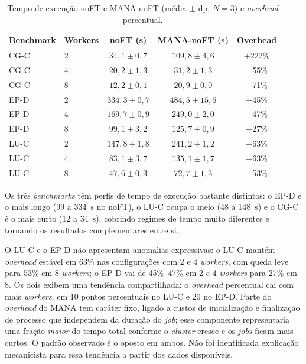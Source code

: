 \begin{table}[htb]
  \caption{Tempo de execução noFT e MANA-noFT (média $\pm$ dp, $N=3$) e
           \textit{overhead} percentual.}
  \label{tab:overhead}
  \centering
  \begin{tabular}{llccc}
    \toprule
    Benchmark & Workers & noFT (s) & MANA-noFT (s) & Overhead \\
    \midrule
    CG-C & 2 & $34{,}1 \pm 0{,}7$  & $109{,}8 \pm 4{,}6$  & +222\% \\
    CG-C & 4 & $20{,}2 \pm 1{,}3$  & $31{,}2 \pm 1{,}3$   & +55\% \\
    CG-C & 8 & $12{,}2 \pm 0{,}1$  & $20{,}9 \pm 0{,}0$   & +71\% \\
    \addlinespace
    EP-D & 2 & $334{,}3 \pm 0{,}7$ & $484{,}5 \pm 15{,}6$ & +45\% \\
    EP-D & 4 & $169{,}7 \pm 0{,}9$ & $249{,}0 \pm 2{,}0$  & +47\% \\
    EP-D & 8 & $99{,}1 \pm 3{,}2$  & $125{,}7 \pm 0{,}9$  & +27\% \\
    \addlinespace
    LU-C & 2 & $147{,}8 \pm 1{,}8$ & $241{,}2 \pm 1{,}2$  & +63\% \\
    LU-C & 4 & $83{,}1 \pm 3{,}7$  & $135{,}1 \pm 1{,}7$  & +63\% \\
    LU-C & 8 & $47{,}6 \pm 0{,}3$  & $72{,}7 \pm 1{,}3$   & +53\% \\
    \bottomrule
  \end{tabular}
\end{table}

Os três \textit{benchmarks} têm perfis de tempo de execução bastante distintos:
o EP-D é o mais longo (99 a 334~s no noFT), o LU-C ocupa o meio (48 a 148~s) e
o CG-C é o mais curto (12 a 34~s), cobrindo regimes de tempo muito diferentes e
tornando os resultados complementares entre si.

O LU-C e o EP-D não apresentam
anomalias expressivas: o LU-C mantém \textit{overhead} estável em 63\% nas
configurações com 2 e 4 \textit{workers}, com queda leve para 53\% em 8
\textit{workers}; o EP-D vai de 45\%--47\% em 2 e 4 \textit{workers} para 27\%
em 8. Os dois exibem uma tendência compartilhada: o \textit{overhead} percentual
cai com mais \textit{workers}, em 10 pontos percentuais no LU-C e 20 no EP-D.
Parte do \textit{overhead} do MANA tem caráter fixo, ligado a custos de
inicialização e finalização de processo que independem da duração do \textit{job};
esse componente representaria uma fração \textit{maior} do tempo total conforme o
\textit{cluster} cresce e os \textit{jobs} ficam mais curtos. O padrão observado
é o oposto em ambos. Não foi identificada explicação mecanicista para essa
tendência a partir dos dados disponíveis.

